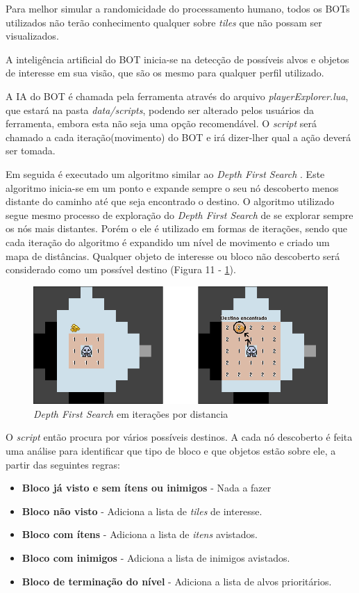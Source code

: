 Para melhor simular a randomicidade do processamento humano, todos os BOTs utilizados não terão conhecimento qualquer sobre \textit{tiles} que não possam ser visualizados. 

A inteligência artificial do BOT inicia-se na detecção de possíveis alvos e objetos de interesse em sua visão, que são os mesmo para qualquer perfil utilizado.

A IA do BOT é chamada pela ferramenta através do arquivo \textit{playerExplorer.lua}, que estará na pasta \textit{data/scripts}, podendo ser alterado pelos usuários da ferramenta, embora esta não seja uma opção recomendável. 
O \textit{script} será chamado a cada iteração(movimento) do BOT e irá dizer-lher qual a ação deverá ser tomada.

Em seguida é executado um algoritmo similar ao \textit{Depth First Search} \cite{depthsearch}. Este algoritmo inicia-se em um ponto e expande sempre o seu nó descoberto menos distante do caminho até que seja encontrado o destino. O algoritmo utilizado segue mesmo processo de exploração do \textit{Depth First Search} de se explorar sempre os nós mais distantes. Porém o ele é utilizado em formas de iterações, sendo que cada iteração do algoritmo é expandido um nível de movimento e criado um mapa de distâncias. Qualquer objeto de interesse ou bloco não descoberto será considerado como um possível destino (Figura 11 - \ref{fig11}). 

\begin{figure}[h]
	\centering
	\label{fig11}
		\includegraphics[keepaspectratio=true,scale=0.5]{figuras/fig11-dfs.png}
	\caption{\textit{Depth First Search} em iterações por distancia}
\end{figure}

O \textit{script} então procura por vários possíveis destinos. A cada nó descoberto é feita uma análise para identificar que tipo de bloco e que objetos estão sobre ele, a partir das seguintes regras:
\begin{itemize}
	\item \textbf{Bloco já visto e sem ítens ou inimigos} - Nada a fazer
	\item \textbf{Bloco não visto} - Adiciona a lista de \textit{tiles} de interesse.
	\item \textbf{Bloco com ítens} - Adiciona a lista de \textit{itens} avistados.
	\item \textbf{Bloco com inimigos} - Adiciona a lista de inimigos avistados.
	\item \textbf{Bloco de terminação do nível} - Adiciona a lista de alvos prioritários. 
\end{itemize}

